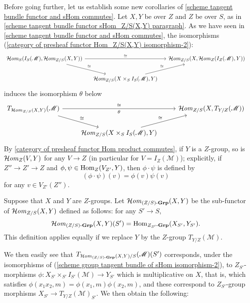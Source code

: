 Before going further, let us establish some new corollaries of \cref{scheme tangent bundle functor and sHom commutes}. Let $X,Y$ be over $Z$ and $Z$ be over $S$, as in \ref{scheme tangent bundle functor sHom_Z/S(X,Y) paragraph}. As we have seen in \cref{scheme tangent bundle functor and sHom commutes}, the isomorphisms (\ref{category of presheaf functor Hom_Z/S(X,Y) isomorphism-2}):
\begin{equation}\label{scheme group tangent bundle of sHom isomorphism-1}
\begin{tikzcd}[column sep=4mm]
\sHom_S(I_S(\mathscr{M}),\sHom_{Z/S}(X,Y))\ar[rd,"\cong"]\ar[rr,"\cong"]&&\sHom_{Z/S}(X,\sHom_Z(I_Z(\mathscr{M}),Y))\\
&\sHom_{Z/S}(X\times_SI_S(\mathscr{M}),Y)\ar[ru,"\cong"]
\end{tikzcd}
\end{equation}
induces the isomorphism $\theta$ below
\begin{equation}\label{scheme group tangent bundle of sHom isomorphism-2}
\begin{tikzcd}
T_{\sHom_{Z/S}(X,Y)}(\mathscr{M})\ar[rd,"\cong"]\ar[rr,"\cong","\theta"']&&\sHom_{Z/S}(X,T_{Y/Z}(\mathscr{M}))\\
&\sHom_{Z/S}(X\times_SI_S(\mathscr{M}),Y)\ar[ru,"\cong"]
\end{tikzcd}
\end{equation}
By \cref{category of presheaf functor Hom product commutes}, if $Y$ is a $Z$-group, so is $\operatorname{\mathcal{H}\hspace*{-0.4pt}\textit{om}\hspace{0.5pt}}_Z(V,Y)$ for any $V\to Z$ (in particular for $V=I_Z(\mathscr{M})$); explicitly, if $Z''\to Z'\to Z$ and $\phi,\psi\in\mathrm{Hom}_Z(V_{Z'},Y)$, then $\phi\cdot\psi$ is defined by
\[(\phi\cdot\psi)(v)=\phi(v)\psi(v)\]
for any $v\in V_{Z'}(Z'')$.

\begin{definition}
Suppose that $X$ and $Y$ are $Z$-groups. Let $\operatorname{\mathcal{H}\hspace*{-0.4pt}\textit{om}\hspace{0.5pt}}_{(Z/S)\textup{-}\mathbf{Grp}}(X,Y)$ be the sub-functor of $\operatorname{\mathcal{H}\hspace*{-0.4pt}\textit{om}\hspace{0.5pt}}_{Z/S}(X,Y)$ defined as follows: for any $S'\to S$,
\begin{equation}\label{scheme group tangent bundle of sHom isomorphism-3}
\operatorname{\mathcal{H}\hspace*{-0.4pt}\textit{om}\hspace{0.5pt}}_{(Z/S)\textup{-}\mathbf{Grp}}(X,Y)(S')=\mathrm{Hom}_{Z_{S'}\textup{-}\mathbf{Grp}}(X_{S'},Y_{S'}).
\end{equation}
This definition applies equally if we replace $Y$ by the $Z$-group $T_{Y/Z}(\mathscr{M})$.
\end{definition}

We then easily see that $T_{\operatorname{\mathcal{H}\hspace*{-0.4pt}\textit{om}\hspace{0.5pt}}_{(Z/S)\textup{-}\mathbf{Grp}}(X,Y)/S}(\mathscr{M})(S')$ corresponds, under the isomorphisms of (\ref{scheme group tangent bundle of sHom isomorphism-2}), to $Z_{S'}$-morphisms $\phi:X_{S'}\times_{S'}I_{S'}(\mathscr{M})\to Y_{S'}$ which is multiplicative on $X$, that is, which satisfies $\phi(x_1x_2,m)=\phi(x_1,m)\phi(x_2,m)$, and these correspond to $Z_{S'}$-group morphisms $X_{S'}\to T_{Y/Z}(\mathscr{M})_{S'}$. We then obtain the following:

